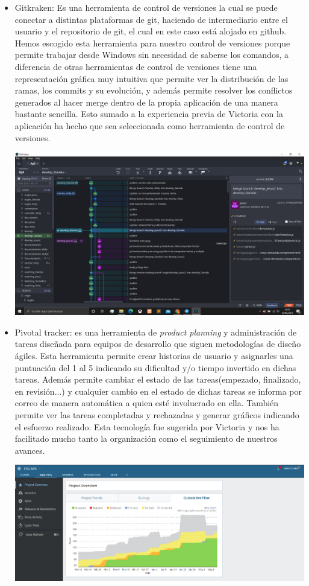 \documentclass[11pt]{article}
\begin{document}
\begin{itemize}
	\item Gitkraken: Es una herramienta de control de versiones la cual se puede conectar a distintas plataformas de git, haciendo de intermediario entre el usuario y el repositorio de git, el cual en este caso está alojado en github. Hemos escogido esta herramienta para nuestro control de versiones porque permite trabajar desde Windows sin necesidad de saberse los comandos, a diferencia de otras herramientas de control de versiones tiene una representación gráfica muy intuitiva que permite ver la distribución de las ramas, los commits y su evolución, y además permite resolver los conflictos generados al hacer merge dentro de la propia aplicación de una manera bastante sencilla. Esto sumado a la experiencia previa de Victoria con la aplicación ha hecho que sea seleccionada como herramienta de control de versiones.

\includegraphics[width=\textwidth]{gitkraken}
	
	\item Pivotal tracker: es una herramienta de \emph{product planning} y administración de tareas diseñada para equipos de desarrollo que siguen metodologías de diseño ágiles.
	Esta herramienta permite crear historias de usuario y asignarles una puntuación del 1 al 5 indicando su dificultad y/o tiempo invertido en dichas tareas. Además permite cambiar el estado de las tareas(empezado, finalizado, en revisión...) y cualquier cambio en el estado de dichas tareas se informa por correo de manera automática a quien esté involucrado en ella.
	También permite ver las tareas completadas y rechazadas y generar gráficos indicando el esfuerzo realizado. Esta tecnología fue sugerida por Victoria y nos ha facilitado mucho tanto la organización como el seguimiento de nuestros avances.

\includegraphics[width=\textwidth]{pivotal}
	

\end{itemize}
\end{document}
